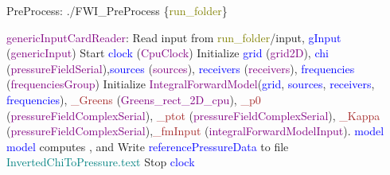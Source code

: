 \documentclass{article}
\begin{document}
\begin{algorithm}
\caption{PreProcess: ./FWI\_PreProcess \{\textcolor{olive}{run\_folder}\}}
\begin{algorithmic}
\State \textcolor{purple}{genericInputCardReader}: Read input from \textcolor{olive}{run\_folder}/input, \textcolor{blue}{gInput} (\textcolor{purple}{genericInput})
\State Start \textcolor{blue}{clock} (\textcolor{purple}{CpuClock})
\State Initialize \textcolor{blue}{grid} (\textcolor{purple}{grid2D}), \textcolor{blue}{chi} (\textcolor{purple}{pressureFieldSerial}),\State \textcolor{blue}{sources} (\textcolor{purple}{sources}), \textcolor{blue}{receivers} (\textcolor{purple}{receivers}), \textcolor{blue}{frequencies} (\textcolor{purple}{frequenciesGroup})
\State {}
\State Initialize \textcolor{purple}{IntegralForwardModel}(\textcolor{blue}{grid}, \textcolor{blue}{sources}, \textcolor{blue}{receivers}, \textcolor{blue}{frequencies}), \State \textcolor{brown}{\_Greens} (\textcolor{purple}{Greens\_rect\_2D\_cpu}), \textcolor{brown}{\_p0} (\textcolor{purple}{pressureFieldComplexSerial}), \State \textcolor{brown}{\_ptot} (\textcolor{purple}{pressureFieldComplexSerial}), \textcolor{brown}{\_Kappa} (\textcolor{purple}{pressureFieldComplexSerial}),\State \textcolor{brown}{\_fmInput} (\textcolor{purple}{integralForwardModelInput}).
\State \Return \textcolor{blue}{model}
\EndProcedure
\State \textcolor{blue}{model} computes ,  and 
\State Write \textcolor{blue}{referencePressureData} to file \textcolor{teal}{InvertedChiToPressure.text}
\EndProcedure
\State Stop \textcolor{blue}{clock}
\end{algorithmic}
\end{algorithm}
\end{document}
